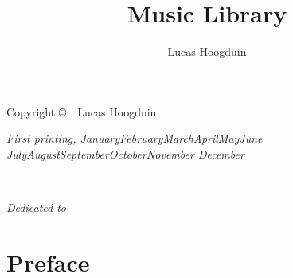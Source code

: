 \documentclass[marginals=raggedright]{tufte-book}
\title{Music Library}
\author{Lucas Hoogduin}
\newcommand{\monthyear}{%
  \ifcase\month\or January\or February\or March\or April\or May\or June\or
  July\or August\or September\or October\or November\or
  December\fi\space\number\year
}
\begin{document}
\frontmatter

\maketitle

\begin{fullwidth}
\vfill
\thispagestyle{empty}
\setlength{\parindent}{0 pt}
\setlength{\parskip}{\baselineskip}
Copyright \copyright\ \the\year\ Lucas Hoogduin 
\par\textit{First printing, \monthyear}
\end{fullwidth}

\tableofcontents

\listoffigures

\listoftables

\cleardoublepage
~\vfill
\begin{doublespace}
\noindent\fontsize{18}{22}\selectfont\itshape
Dedicated to 
\end{doublespace}
\vfill
\vfill


\cleardoublepage
\chapter*{Preface}


\mainmatter






 




% 

% 






% 


% 
% 
% 
% 
% 


% 





% 
















\printnomenclature
{}

\backmatter

\begin{fullwidth}
  \printindex
\end{fullwidth}

\end{document}
